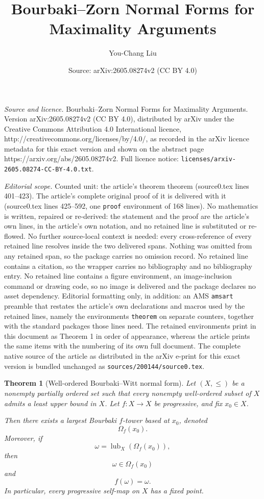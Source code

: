\documentclass[10pt,a4paper]{amsart}
\title{Bourbaki--Zorn Normal Forms for Maximality Arguments}
\author{You-Chang Liu}
\date{Source: arXiv:2605.08274v2 (CC BY 4.0)}
\newtheorem{theorem}{Theorem}
\newcommand{\lub}{\operatorname{lub}}
\begin{document}
\maketitle

\noindent\emph{Source and licence.} Bourbaki--Zorn Normal Forms for Maximality Arguments. Version arXiv:2605.08274v2 (CC BY 4.0), distributed by arXiv under the Creative Commons Attribution 4.0 International licence, http://creativecommons.org/licenses/by/4.0/, as recorded in the arXiv licence metadata for this exact version and shown on the abstract page https://arxiv.org/abs/2605.08274v2. Full licence notice: \texttt{licenses/arxiv-2605.08274-CC-BY-4.0.txt}.\par\smallskip

\noindent\textit{Editorial scope.} Counted unit: the article's theorem theorem (source0.tex lines 401--423). The article's complete original proof of it is delivered with it (source0.tex lines 425--592, one \texttt{proof} environment of 168 lines). No mathematics is written, repaired or re-derived: the statement and the proof are the article's own lines, in the article's own notation, and no retained line is substituted or re-flowed.  No further source-local context is needed: every cross-reference of every retained line resolves inside the two delivered spans.  Nothing was omitted from any retained span, so the package carries no omission record.  No retained line contains a citation, so the wrapper carries no bibliography and no bibliography entry.  No retained line contains a figure environment, an image-inclusion command or drawing code, so no image is delivered and the package declares no asset dependency.  Editorial formatting only, in addition: an AMS \texttt{amsart} preamble that restates the article's own declarations and macros used by the retained lines, namely the environments \texttt{theorem} on separate counters, together with the standard packages those lines need.  The retained environments print in this document as Theorem 1 in order of appearance, whereas the article prints the same items with the numbering of its own full document.  The complete native source of the article as distributed in the arXiv e-print for this exact version is bundled unchanged as \texttt{sources/200144/source0.tex}.
\begin{theorem}[Well-ordered Bourbaki--Witt normal form]
Let \((X,\leq)\) be a nonempty partially ordered set such that every nonempty
well-ordered subset of \(X\) admits a least upper bound in \(X\). Let \(f:X\to X\) be
progressive, and fix \(x_0\in X\).

Then there exists a largest Bourbaki \(f\)-tower based at \(x_0\), denoted
\[
\Omega_f(x_0).
\]
Moreover, if
\[
\omega=\lub_X(\Omega_f(x_0)),
\]
then
\[
\omega\in \Omega_f(x_0)
\]
and
\[
f(\omega)=\omega.
\]
In particular, every progressive self-map on \(X\) has a fixed point.
\end{theorem}
\end{document}
